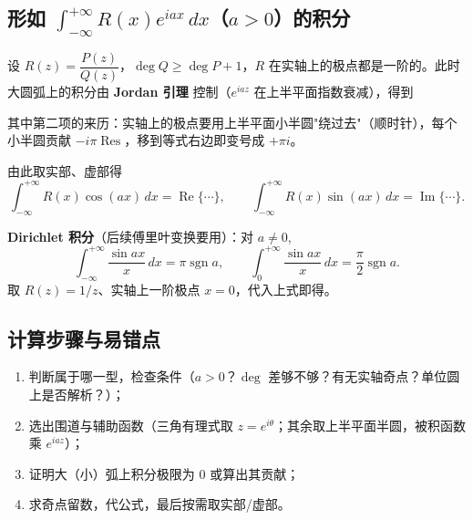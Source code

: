 
\subsection{形如 \(\int_{-\infty}^{+\infty}R(x)e^{iax}\,dx\)（\(a>0\)）的积分}

设 \(R(z)=\dfrac{P(z)}{Q(z)}\)，\(\deg Q\ge \deg P+1\)，\(R\) 在实轴上的极点都是一阶的。此时大圆弧上的积分由 \textbf{Jordan 引理} 控制（\(e^{iaz}\) 在上半平面指数衰减），得到


其中第二项的来历：实轴上的极点要用上半平面小半圆"绕过去"（顺时针），每个小半圆贡献 \(-i\pi\operatorname{Res}\)，移到等式右边即变号成 \(+\pi i\)。

由此取实部、虚部得
\[
\int_{-\infty}^{+\infty}R(x)\cos(ax)\,dx=\operatorname{Re}\{\cdots\},\qquad
\int_{-\infty}^{+\infty}R(x)\sin(ax)\,dx=\operatorname{Im}\{\cdots\}.
\]

\textbf{Dirichlet 积分}（后续傅里叶变换要用）：对 \(a\neq0\),
\[
\int_{-\infty}^{+\infty}\frac{\sin ax}{x}\,dx=\pi\operatorname{sgn}a,
\qquad
\int_0^{+\infty}\frac{\sin ax}{x}\,dx=\frac{\pi}{2}\operatorname{sgn}a .
\]
取 \(R(z)=1/z\)、实轴上一阶极点 \(x=0\)，代入上式即得。

\subsection{计算步骤与易错点}

\begin{enumerate}
    \item 判断属于哪一型，检查条件（\(a>0\)？\(\deg\) 差够不够？有无实轴奇点？单位圆上是否解析？）；
    \item 选出围道与辅助函数（三角有理式取 \(z=e^{i\theta}\)；其余取上半平面半圆，被积函数乘 \(e^{iaz}\)）；
    \item 证明大（小）弧上积分极限为 \(0\) 或算出其贡献；
    \item 求奇点留数，代公式，最后按需取实部/虚部。
\end{enumerate}


